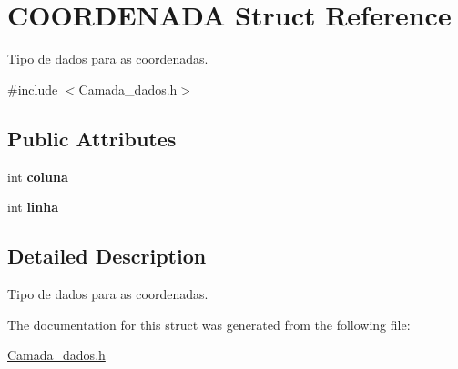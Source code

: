 \hypertarget{structCOORDENADA}{}\section{C\+O\+O\+R\+D\+E\+N\+A\+DA Struct Reference}
\label{structCOORDENADA}


Tipo de dados para as coordenadas.  




{\ttfamily \#include $<$Camada\+\_\+dados.\+h$>$}

\subsection*{Public Attributes}
\begin{DoxyCompactItemize}
\item 
\mbox{\label{structCOORDENADA_adfbc8d4856ce807139fdf62e00aed29a}} 
int {\bfseries coluna}
\item 
\mbox{\label{structCOORDENADA_aefe14bcc5a066ac3b21500cc3d28c06f}} 
int {\bfseries linha}
\end{DoxyCompactItemize}


\subsection{Detailed Description}
Tipo de dados para as coordenadas. 

The documentation for this struct was generated from the following file\+:\begin{DoxyCompactItemize}
\item 
\hyperlink{Camada__dados_8h}{Camada\+\_\+dados.\+h}\end{DoxyCompactItemize}
